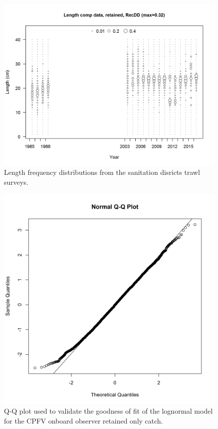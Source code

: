 \documentclass[12pt,]{article}
\begin{document}
\begin{figure}[htbp]
\centering
\includegraphics{r4ss/plots_mod1/comp_lendat_bubflt6mkt2.png}
\caption{Length frequency distributions from the sanitation disricts
trawl surveys. \label{fig:Fleet6_comp_lendat_bubflt6mkt2}}
\end{figure}

\begin{figure}[htbp]
\centering
\includegraphics{Figures/Fleet12_RecPCOB_QQ.png}
\caption{Q-Q plot used to validate the goodness of fit of the lognormal
model for the CPFV onboard observer retained only catch.
\label{fig:Fleet12_RecPCOBR_QQ}}
\end{figure}
\end{document}
